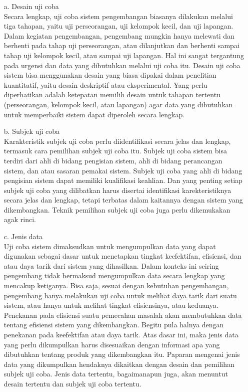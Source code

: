 \documentclass{jtetiproposalskripsi}
\begin{document}
\begin{itemize} 
\item[a.] Desain uji coba\\
Secara lengkap, uji coba sistem pengembangan biasanya dilakukan melalui tiga tahapan, yaitu uji perseorangan, uji kelompok kecil, dan uji lapangan. Dalam kegiatan pengembangan, pengembang mungkin  hanya melewati dan berhenti pada tahap uji perseorangan, atau dilanjutkan dan berhenti sampai tahap uji kelompok kecil, atau sampai uji lapangan. Hal ini sangat tergantung pada urgensi dan data yang dibutuhkan melalui uji coba itu. Desain uji coba sistem bisa menggunakan desain yang biasa dipakai dalam penelitian kuantitatif, yaitu desain deskriptif atau eksperimental. Yang perlu diperhatikan adalah ketepatan memilih desain untuk tahapan tertentu (perseorangan, kelompok kecil, atau lapangan) agar data yang dibutuhkan untuk memperbaiki sistem dapat diperoleh secara lengkap. 
\item[b.] Subjek uji coba \\
Karakteristik subjek uji coba perlu diidentifikasi secara jelas dan lengkap, termasuk cara pemilihan subjek uji coba itu. Subjek uji coba sistem bisa terdiri dari ahli di bidang pengisian sistem, ahli di bidang perancangan sistem, dan atau sasaran pemakai sistem. Subjek uji coba yang ahli di bidang pengisian sistem dapat memiliki kualifikasi keahlian. Dan yang penting setiap subjek uji coba yang dilibatkan harus disertai identifikasi karekteristiknya secara jelas dan lengkap, tetapi terbatas dalam kaitannya dengan sistem yang dikembangkan. Teknik pemilihan subjek uji coba juga perlu dikemukakan agak rinci. 
\item[c.] Jenis data  \\
Uji coba sistem dimaksudkan untuk mengumpulkan data yang dapat digunakan sebagai dasar untuk menetapkan tingkat keefektifan, efisiensi, dan atau daya tarik dari sistem yang dihasilkan. Dalam konteks ini seiring pengembang tidak bermaksud mengumpulkan data secara lengkap yang  mencakup ketiganya. Bisa saja, sesuai dengan kebutuhan pengembangan, pengembang hanya melakukan uji coba untuk melihat daya tarik dari suatu sistem, atau hanya untuk melihat tingkat efisiensinya, atau keduanya. Penekanan pada efisiensi suatu pemecahan masalah akan membutuhkan data tentang efisiensi sistem yang  dikembangkan. Begitu pula halnya dengan penekanan pada keefektifan atau daya tarik. Atas dasar ini, maka jenis data yang perlu dikumpulkan harus disesuaikan dengan informasi apa yang dibutuhkan tentang produk yang dikembangkan itu. Paparan mengenai jenis data yang dikumpulkan hendaknya dikaitkan dengan desain dan pemilihan subjek uji coba. Jenis data tertentu, bagaimanapun juga, akan menuntut desain tertentu dan subjek uji coba tertentu.

\end{itemize}
\end{document}
